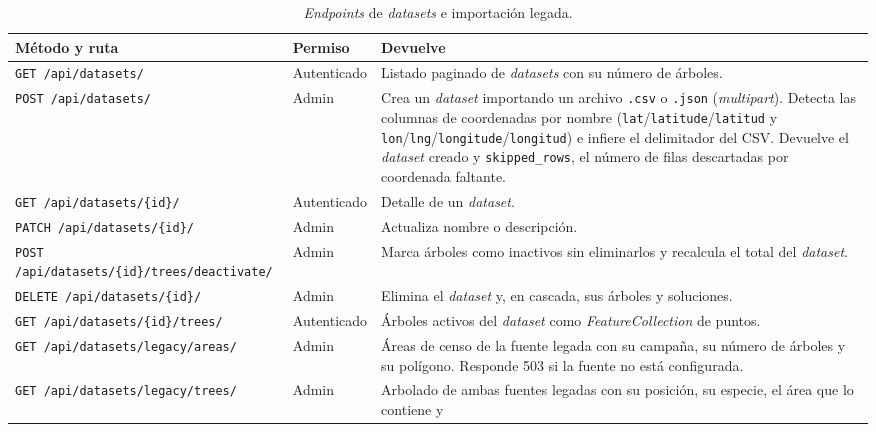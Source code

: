 \begin{table}[H]
  \centering
  \caption{\textit{Endpoints} de \textit{datasets} e importación legada.}
  \label{tab:anexo_api_datasets}
  \small
  \begin{tabularx}{\textwidth}{@{}p{5.5cm} p{1.9cm} X@{}}
    \toprule
    Método y ruta &
      Permiso &
      Devuelve \\
    \midrule
    \texttt{GET \slash api\slash datasets\slash } &
      Autenticado &
      Listado paginado de \textit{datasets} con su número de árboles. \\
    \texttt{POST \slash api\slash datasets\slash } &
      Admin &
      Crea un \textit{dataset} importando un archivo \texttt{.csv} o \texttt{.json}
      (\textit{multipart}). Detecta las columnas de coordenadas por nombre
      (\texttt{lat}/\texttt{latitude}/\texttt{latitud} y
      \texttt{lon}/\texttt{lng}/\texttt{longitude}/\texttt{longitud}) e infiere el delimitador
      del CSV. Devuelve el \textit{dataset} creado y \texttt{skipped\_rows}, el número de filas
      descartadas por coordenada faltante. \\
    \texttt{GET \slash api\slash datasets\slash \{id\}\slash } &
      Autenticado &
      Detalle de un \textit{dataset}. \\
    \texttt{PATCH \slash api\slash datasets\slash \{id\}\slash } &
      Admin &
      Actualiza nombre o descripción. \\
    \texttt{POST \slash api\slash datasets\slash \{id\}\slash trees\slash deactivate\slash } &
      Admin &
      Marca árboles como inactivos sin eliminarlos y recalcula el total del \textit{dataset}. \\
    \texttt{DELETE \slash api\slash datasets\slash \{id\}\slash } &
      Admin &
      Elimina el \textit{dataset} y, en cascada, sus árboles y soluciones. \\
    \texttt{GET \slash api\slash datasets\slash \{id\}\slash trees\slash } &
      Autenticado &
      Árboles activos del \textit{dataset} como \textit{FeatureCollection} de puntos. \\
    \texttt{GET \slash api\slash datasets\slash legacy\slash areas\slash } &
      Admin &
      Áreas de censo de la fuente legada con su campaña, su número de árboles y su polígono.
      Responde 503 si la fuente no está configurada. \\
    \texttt{GET \slash api\slash datasets\slash legacy\slash trees\slash } &
      Admin &
      Arbolado de ambas fuentes legadas con su posición, su especie, el área que lo contiene y

\end{tabularx}
\end{table}
